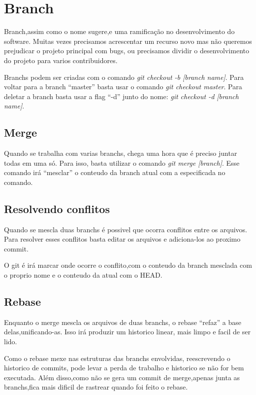 \documentclass[]{article}
\begin{document}
\section{Branch}

Branch,assim como o nome sugere,e uma ramificação no desenvolvimento do software.
Muitas vezes precisamos acrescentar um recurso novo mas não queremos prejudicar o projeto principal com bugs, 
ou precisamos dividir o desenvolvimento do projeto para varios contribuidores.


Branchs podem ser criadas com o comando \textit{git checkout -b [branch name]}.
Para voltar para a branch ``master'' basta usar o comando \textit{git checkout master}.
Para deletar a branch basta usar a flag ``-d'' junto do nome: \textit{git checkout -d [branch name]}.

\subsection*{Merge}

Quando se trabalha com varias branchs, chega uma hora que é preciso juntar todas em uma só.
 Para isso, basta utilizar o comando \textit{git merge [branch]}.
 Esse comando irá ``mesclar'' o conteudo da branch atual com a especificada no comando.

\subsection*{Resolvendo conflitos}
Quando se mescla duas branchs é possivel que ocorra conflitos entre os arquivos.
Para resolver esses conflitos basta editar os arquivos e adiciona-los ao proximo commit.

O git é irá marcar onde ocorre o conflito,com o conteudo da branch mesclada com o proprio nome e o conteudo da atual com o HEAD.

\subsection*{Rebase}
Enquanto o merge mescla os arquivos de duas branchs, o rebase ``refaz'' a base delas,unificando-as.
Isso irá produzir um historico linear, mais limpo e facil de ser lido. 

Como o rebase mexe nas estruturas das branchs envolvidas, reescrevendo o historico de commits, pode levar a perda de trabalho e historico se não for bem executada.
Além disso,como não se gera um commit de merge,apenas junta as branchs,fica mais dificil de rastrear quando foi feito o rebase.
\end{document}

